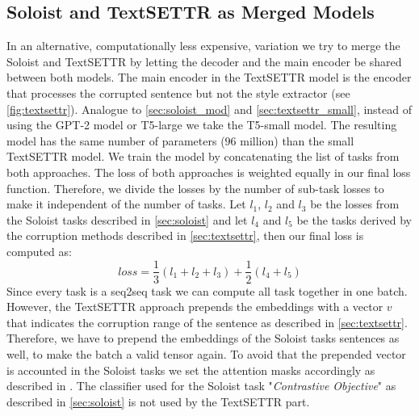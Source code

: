 \documentclass[twocolumn]{tum-article}
\begin{document}
\subsection{Soloist and TextSETTR as Merged Models}
In an alternative, computationally less expensive, variation we try to merge the Soloist and TextSETTR by letting the decoder and the main encoder be shared between both models. The main encoder in the TextSETTR model is the encoder that processes the corrupted sentence but not the style extractor (see \autoref{fig:textsettr}). Analogue to \autoref{sec:soloist_mod} and \autoref{sec:textsettr_small}, instead of using the GPT-2 model or T5-large we take the T5-small model. The resulting model has the same number of parameters ($96$ million) than the small TextSETTR model. We train the model by concatenating the list of tasks from both approaches. The loss of both approaches is weighted equally in our final loss function. Therefore, we divide the losses by the number of sub-task losses to make it independent of the number of tasks. Let $l_1$, $l_2$ and $l_3$ be the losses from the Soloist tasks described in \autoref{sec:soloist} and let $l_4$ and $l_5$ be the tasks derived by the corruption methods described in \autoref{sec:textsettr}, then our final loss is computed as:
$$
loss = \frac{1}{3}(l_1 + l_2 + l_3) + \frac{1}{2} (l_4 + l_5)
$$
Since every task is a seq2seq task we can compute all task together in one batch. However, the TextSETTR approach prepends the embeddings with a vector $v$ that indicates the corruption range of the sentence as described in \autoref{sec:textsettr}. Therefore, we have to prepend the embeddings of the Soloist tasks sentences as well, to make the batch a valid tensor again. To avoid that the prepended vector is accounted in the Soloist tasks we set the attention masks accordingly as described in \cite{vaswani2017attention}. The classifier used for the Soloist task "\textit{Contrastive Objective}" as described in \autoref{sec:soloist} is not used by the TextSETTR part.
\end{document}
